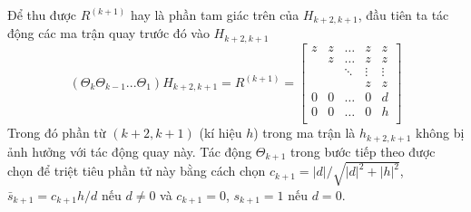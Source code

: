 Để thu được $R^{(k+1)}$ hay là phần tam giác trên của $H_{k+2,k+1}$, đầu tiên ta tác động các ma trận quay 
trước đó vào $H_{k+2,k+1}$ 
\begin{equation}
    \left(\Theta_k \Theta_{k-1} ... \Theta_1\right)H_{k+2,k+1} = R^{(k+1)} =
    \begin{bmatrix}
        z & z & \ldots & z & z\\
        & z & \ldots & z & z\\
        & & \ddots & \vdots & \vdots\\
        & & & z & z\\
        0 & 0 & \ldots & 0 & d \\
        0 & 0 & \ldots & 0 & h \\
    \end{bmatrix}
\end{equation}
Trong đó phần từ $(k+2, k+1)$ (kí hiệu $h$) trong ma trận là $h_{k+2,k+1}$ không bị ảnh hưởng
với tác động quay này. Tác động $\Theta_{k+1}$ trong bước tiếp theo được chọn để triệt tiêu phần 
tử này bằng cách chọn $c_{k+1} = |d|/\sqrt{|d|^2 + |h|^2}$, $\bar{s}_{k+1} = c_{k+1}h/d$ nếu $d \neq 0$
và $c_{k+1} = 0$, $s_{k+1} = 1$ nếu $d=0$.